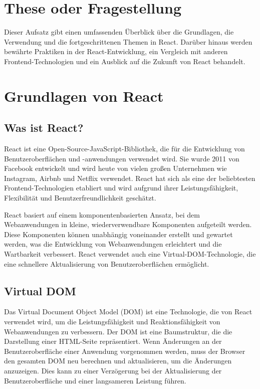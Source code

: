 \section{These oder Fragestellung}
Dieser Aufsatz gibt einen umfassenden Überblick über die Grundlagen, die Verwendung und die fortgeschrittenen Themen in React. Darüber hinaus werden bewährte Praktiken in der React-Entwicklung, ein Vergleich mit anderen Frontend-Technologien und ein Ausblick auf die Zukunft von React behandelt.

\section{Grundlagen von React}
\subsection{Was ist React?}
React ist eine Open-Source-JavaScript-Bibliothek, die für die Entwicklung von Benutzeroberflächen und -anwendungen verwendet wird. Sie wurde 2011 von Facebook entwickelt und wird heute von vielen großen Unternehmen wie Instagram, Airbnb und Netflix verwendet. React hat sich als eine der beliebtesten Frontend-Technologien etabliert und wird aufgrund ihrer Leistungsfähigkeit, Flexibilität und Benutzerfreundlichkeit geschätzt.

React basiert auf einem komponentenbasierten Ansatz, bei dem Webanwendungen in kleine, wiederverwendbare Komponenten aufgeteilt werden. Diese Komponenten können unabhängig voneinander erstellt und gewartet werden, was die Entwicklung von Webanwendungen erleichtert und die Wartbarkeit verbessert. React verwendet auch eine Virtual-DOM-Technologie, die eine schnellere Aktualisierung von Benutzeroberflächen ermöglicht.


\subsection{Virtual DOM}
Das Virtual Document Object Model (DOM) ist eine Technologie, die von React verwendet wird, um die Leistungsfähigkeit und Reaktionsfähigkeit von Webanwendungen zu verbessern. Der DOM ist eine Baumstruktur, die die Darstellung einer HTML-Seite repräsentiert. Wenn Änderungen an der Benutzeroberfläche einer Anwendung vorgenommen werden, muss der Browser den gesamten DOM neu berechnen und aktualisieren, um die Änderungen anzuzeigen. Dies kann zu einer Verzögerung bei der Aktualisierung der Benutzeroberfläche und einer langsameren Leistung führen.

